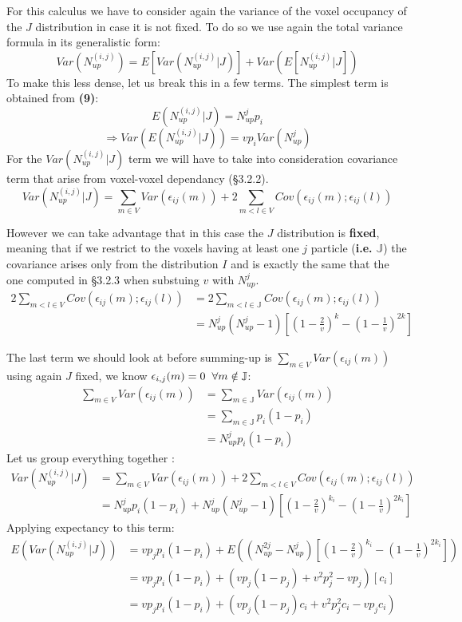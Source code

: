 \documentclass{article}
\begin{document}
For this calculus we have to consider again the variance of the voxel occupancy of the $J$ distribution in case it is not fixed. To do so we use again
the total variance formula in its generalistic form:
\[
    Var(N^{(i,j)}_{up}) = E[Var(N^{(i,j)}_{up}|J)] + Var(E[N^{(i,j)}_{up}|J])
\]
To make this less dense, let us break this in a few terms.\newline
The simplest term is obtained from \textbf{(9)}:
\[
E(N^{(i,j)}_{up}|J) = N^j_{up}p_i
\]
\[
    \Rightarrow Var(E(N^{(i,j)}_{up}|J)) = vp_iVar(N^j_{up})
\]
For the $Var(N^{(i,j)}_{up}|J)$ term we will have to take into consideration covariance term that arise from voxel-voxel dependancy (\S3.2.2). 
\[
    Var(N^{(i,j)}_{up}|J) = \sum_{m\in V}Var(\epsilon_{ij}(m)) + 2\sum_{m < l \in V}Cov(\epsilon_{ij}(m); \epsilon_{ij}(l))
\]

However we can take advantage that in this case the $J$ distribution is \textbf{fixed}, meaning that if we restrict
to the voxels having at least one $j$ particle (\textbf{i.e.} $\mathbb{J}$) the covariance arises only from the distribution $I$ and is exactly the same
that the one computed in \S3.2.3 when substuing $v$ with $N^j_{up}$.
\[\begin{split}
    2\sum_{m < l \in V}Cov(\epsilon_{ij}(m); \epsilon_{ij}(l)) &= 2\sum_{m < l \in \mathbb{J}}Cov(\epsilon_{ij}(m); \epsilon_{ij}(l)) \\
                & = N^j_{up}(N^j_{up}-1)[(1-\frac{2}{v})^k - (1-\frac{1}{v})^{2k}]
\end{split}
\]

The last term we should look at before summing-up is $\sum_{m\in V}Var(\epsilon_{ij}(m))$ using again $J$ fixed, we know $\epsilon_{i,j}(m) = 0 \hspace{0.20cm}\forall m \notin \mathbb{J}$:
\[\begin{split}
    \sum_{m\in V}Var(\epsilon_{ij}(m))&= \sum_{m\in \mathbb{J}}Var(\epsilon_{ij}(m))\\
                                      &=  \sum_{m\in \mathbb{J}}p_i(1-p_i) \\
                                      &=N^j_{up}p_i(1-p_i)
\end{split}
\]
Let us group everything together :
\[\begin{split}
    Var(N^{(i,j)}_{up}|J) &= \sum_{m\in V}Var(\epsilon_{ij}(m)) + 2\sum_{m < l \in V}Cov(\epsilon_{ij}(m); \epsilon_{ij}(l)) \\
                          &= N^j_{up}p_i(1-p_i)+ N^j_{up}(N^j_{up}-1)[(1-\frac{2}{v})^{k_i} - (1-\frac{1}{v})^{2k_i}]
\end{split}
\]
Applying expectancy to this term:
\[\begin{split}
E(Var(N^{(i,j)}_{up}|J)) &= vp_jp_i(1-p_i) + E((N^{2j}_{up} - N^j_{up})[(1-\frac{2}{v})^{k_i} - (1-\frac{1}{v})^{2k_i}]) \\
    &= vp_jp_i(1-p_i) + (vp_j(1-p_j) + v^2p^2_j - vp_j)[c_i] \\
    &= vp_jp_i(1-p_i) + (vp_j(1-p_j)c_i + v^2p^2_jc_i - vp_jc_i) \\
\end{split}
\]
\end{document}
